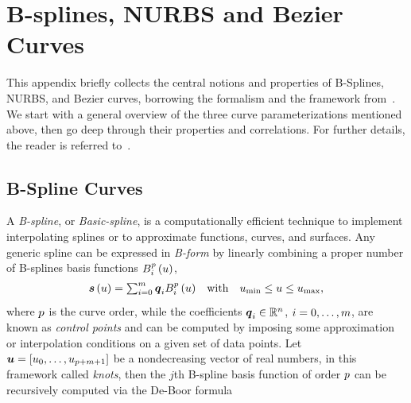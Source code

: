 \chapter{B-splines, NURBS and B\acuteacc ezier Curves}%
\label{SEC:SPLINES-APPENDIX}
This appendix briefly collects the central notions and properties of B-Splines, NURBS, and
B\acuteacc ezier curves, borrowing the formalism and the framework from~\cite{biagiotti2008trajectory}.
We start with a general overview of the three curve parameterizations mentioned above,
then go deep through their properties and correlations.
For further details, the reader is referred to~\cite{biagiotti2008trajectory, qin1998general, farouki2012bernstein}.

\section{B-Spline Curves}
A \emph{B-spline}, or \emph{Basic-spline}, is a computationally efficient technique to implement
interpolating splines or to approximate functions, curves, and surfaces.
Any generic spline can be expressed in \emph{B-form} by linearly combining a proper
number of B-splines basis functions $B_i^{p} \left( u \right)$,
\begin{equation*}
    \begin{matrix}
        \boldsymbol{s} \left( u \right) = \sum_{i=0}^{m} \boldsymbol{q}_i B_i^{p} \left( u \right) &
        \text{with} & u_{\text{min}} \le u \le u_{\text{max}},
    \end{matrix}
\end{equation*}
where $p$ is the curve order, while the coefficients $\boldsymbol{q}_i \in \mathbb{R}^{n}$, $i = 0, \dots, m$, are known
as \emph{control points} and can be computed by imposing some approximation or interpolation conditions on
a given set of data points. Let $\boldsymbol{u} = \left[ u_0, \dots, u_{p + m + 1} \right]$
be a nondecreasing vector of real numbers, in this framework called \emph{knots}, then the $j$th B-spline
basis function of order $p$ can be recursively computed via the De-Boor formula~\cite*{de1978practical}
